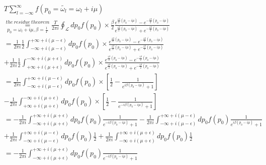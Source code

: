 \documentclass{article}
\begin{document}
\begin{equation}\label{equation2s}
    \begin{split}
        &T\sum_{l=-\infty}^{\infty}f\left(p_0=\widetilde{\omega_l}=\omega_l+i\mu\right)\\
        &\stackrel{the\  residue\  theorem}{\underset{p_0=\omega_l+i\mu,\beta=\frac{1}{T}}{=}}\frac{T}{2\pi i}\oint_{\mathcal{L}} dp_0 f\left(p_0\right)\times \frac{\beta}{2}\frac{e^{\frac{i\beta}{2}\left(p_0-i\mu\right)}-e^{-\frac{i\beta}{2}\left(p_0-i\mu\right)}}{e^{\frac{i\beta}{2}\left(p_0-i\mu\right)}+e^{-\frac{i\beta}{2}\left(p_0-i\mu\right)}}\\
        &=\frac{1}{2\pi i}\frac{1}{2}\int_{-\infty+i\left(\mu-\epsilon\right)}^{+\infty+i\left(\mu-\epsilon\right)} dp_0 f\left(p_0\right)\times \frac{e^{\frac{i\beta}{2}\left(p_0-i\mu\right)}-e^{-\frac{i\beta}{2}\left(p_0-i\mu\right)}}{e^{\frac{i\beta}{2}\left(p_0-i\mu\right)}+e^{-\frac{i\beta}{2}\left(p_0-i\mu\right)}}\\
        &+\frac{1}{2\pi i}
        \frac{1}{2}\int_{+\infty+i\left(\mu+\epsilon\right)}^{-\infty+i\left(\mu+\epsilon\right)} dp_0 f\left(p_0\right)\times \frac{e^{\frac{i\beta}{2}\left(p_0-i\mu\right)}-e^{-\frac{i\beta}{2}\left(p_0-i\mu\right)}}{e^{\frac{i\beta}{2}\left(p_0-i\mu\right)}+e^{-\frac{i\beta}{2}\left(p_0-i\mu\right)}}\\
        &=\frac{1}{2\pi i}\int_{-\infty+i\left(\mu-\epsilon\right)}^{+\infty+i\left(\mu-\epsilon\right)} dp_0 f\left(p_0\right)\times 
        [\frac{1}{2}-\frac{1}{e^{i\beta\left(p_0-i\mu\right)}+1}]\\
        &-\frac{1}{2\pi i}\int_{+\infty+i\left(\mu+\epsilon\right)}^{-\infty+i\left(\mu+\epsilon\right)} dp_0 f\left(p_0\right)\times 
        [\frac{1}{2}-\frac{1}{e^{-i\beta\left(p_0-i\mu\right)}+1}]\\
        &=-\frac{1}{2\pi i}\int_{-\infty+i\left(\mu+\epsilon\right)}^{+\infty+i\left(\mu+\epsilon\right)}dp_0 f\left(p_0\right)\frac{1}{e^{-i\beta\left(p_0-i\mu\right)}+1}
        -\frac{1}{2\pi i}\int_{-\infty+i\left(\mu-\epsilon\right)}^{+\infty+i\left(\mu-\epsilon\right)}dp_0 f\left(p_0\right)\frac{1}{e^{i\beta\left(p_0-i\mu\right)}+1}\\
        &+\frac{1}{2\pi i}\int_{-\infty+i\left(\mu-\epsilon\right)}^{+\infty+i\left(\mu-\epsilon\right)}dp_0 f\left(p_0\right)\frac{1}{2}+\frac{1}{2\pi i}\int_{-\infty+i\left(\mu+\epsilon\right)}^{+\infty+i\left(\mu+\epsilon\right)}dp_0 f\left(p_0\right)\frac{1}{2}\\
        &=-\frac{1}{2\pi i}\int_{-\infty+i\left(\mu+\epsilon\right)}^{+\infty+i\left(\mu+\epsilon\right)}dp_0 f\left(p_0\right)\frac{1}{e^{-i\beta\left(p_0-i\mu\right)}+1}

\end{split}
\end{equation}
\end{document}
